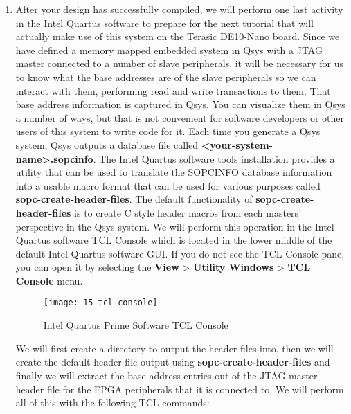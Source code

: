 \begin{flushleft}
\begin{enumerate}[
	label=\textbf{Step \arabic*.},
	leftmargin=*,
	widest={00},
	align=left]
\item After your design has successfully compiled, we will perform one last activity in the Intel Quartus software to prepare for the next tutorial that will actually make use of this system on the Terasic DE10-Nano board.  Since we have defined a memory mapped embedded system in Qsys with a JTAG master connected to a number of slave peripherals, it will be necessary for us to know what the base addresses are of the slave peripherals so we can interact with them, performing read and write transactions to them.  That base address information is captured in Qsys. You can visualize them in Qsys a number of ways, but that is not convenient for software developers or other users of this system to write code for it.  Each time you generate a Qsys system, Qsys outputs a database file called \textbf{<your-system-name>.sopcinfo}.  The Intel Quartus software tools installation provides a utility that can be used to translate the SOPCINFO database information into a usable macro format that can be used for various purposes called \textbf{sopc-create-header-files}.  The default functionality of \textbf{sopc-\allowbreak create-\allowbreak header-\allowbreak files} is to create C style header macros from each masters' perspective in the Qsys system.  We will perform this operation in the Intel Quartus software TCL Console which is located in the lower middle of the default Intel Quartus software GUI.  If you do not see the TCL Console pane, you can open it by selecting the \textbf{View} > \textbf{Utility Windows} > \textbf{TCL Console} menu.

\begin{figure}[H]
\centering
\texttt{[image: 15-tcl-console]}
\caption{Intel Quartus Prime Software TCL Console}
\label{fig:15-tcl-console}
\end{figure}

We will first create a directory to output the header files into, then we will create the default header file output using \textbf{sopc-create-header-files} and finally we will extract the base address entries out of the JTAG master header file for the FPGA peripherals that it is connected to.  We will perform all of this with the following TCL commands:

\begin{verbatim}


\end{verbatim}
\end{enumerate}
\end{flushleft}
